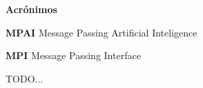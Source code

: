 %
%
%






\begin{flushleft}
	\huge{\textbf{Acrónimos}}
\end{flushleft}

\vspace{1cm}

\textbf{MPAI} Message Passing Artificial Inteligence

\vspace{0.5cm}

\textbf{MPI} Message Passing Interface 

\vspace{0.5cm}

\color{blue} TODO... \color{black}



